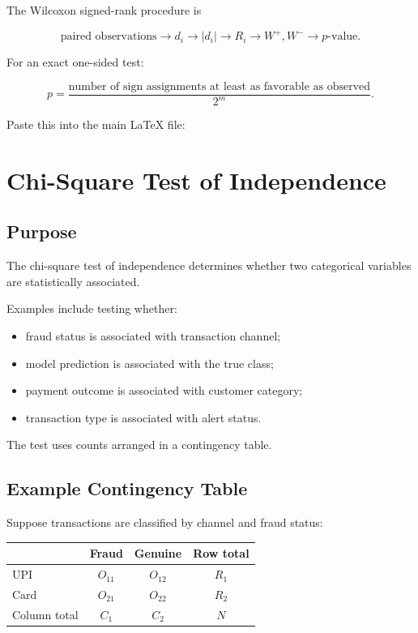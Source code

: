 \documentclass[11pt]{article}
\begin{document}
The Wilcoxon signed-rank procedure is

\[
\boxed{
\text{paired observations}
\rightarrow
d_i
\rightarrow
|d_i|
\rightarrow
R_i
\rightarrow
W^+,W^-
\rightarrow
p\text{-value}.
}
\]

For an exact one-sided test:

\[
\boxed{
p
=
\frac{
\text{number of sign assignments at least as favorable as observed}
}{
2^m
}.
}
\]

Paste this into the main LaTeX file:

\section{Chi-Square Test of Independence}

\subsection{Purpose}

The chi-square test of independence determines whether two categorical
variables are statistically associated.

Examples include testing whether:

\begin{itemize}[noitemsep]
    \item fraud status is associated with transaction channel;
    \item model prediction is associated with the true class;
    \item payment outcome is associated with customer category;
    \item transaction type is associated with alert status.
\end{itemize}

The test uses counts arranged in a contingency table.

\subsection{Example Contingency Table}

Suppose transactions are classified by channel and fraud status:

\begin{center}
\begin{tabular}{lccc}
\toprule
 & Fraud & Genuine & Row total \\
\midrule
UPI  & \(O_{11}\) & \(O_{12}\) & \(R_1\) \\
Card & \(O_{21}\) & \(O_{22}\) & \(R_2\) \\
\midrule
Column total & \(C_1\) & \(C_2\) & \(N\) \\
\bottomrule
\end{tabular}
\end{center}
\end{document}
